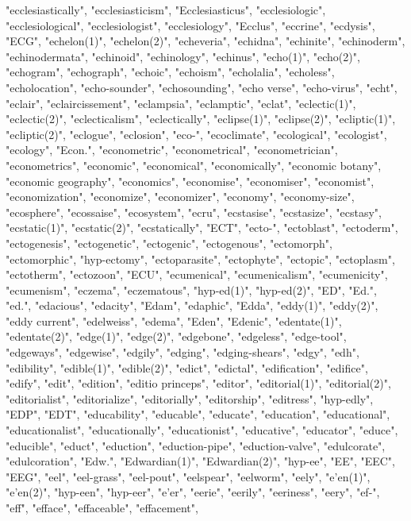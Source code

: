 "ecclesiastically",
"ecclesiasticism",
"Ecclesiasticus",
"ecclesiologic",
"ecclesiological",
"ecclesiologist",
"ecclesiology",
"Ecclus",
"eccrine",
"ecdysis",
"ECG",
"echelon(1)",
"echelon(2)",
"echeveria",
"echidna",
"echinite",
"echinoderm",
"echinodermata",
"echinoid",
"echinology",
"echinus",
"echo(1)",
"echo(2)",
"echogram",
"echograph",
"echoic",
"echoism",
"echolalia",
"echoless",
"echolocation",
"echo-sounder",
"echosounding",
"echo verse",
"echo-virus",
"echt",
"eclair",
"eclaircissement",
"eclampsia",
"eclamptic",
"eclat",
"eclectic(1)",
"eclectic(2)",
"eclecticalism",
"eclectically",
"eclipse(1)",
"eclipse(2)",
"ecliptic(1)",
"ecliptic(2)",
"eclogue",
"eclosion",
"eco-",
"ecoclimate",
"ecological",
"ecologist",
"ecology",
"Econ.",
"econometric",
"econometrical",
"econometrician",
"econometrics",
"economic",
"economical",
"economically",
"economic botany",
"economic geography",
"economics",
"economise",
"economiser",
"economist",
"economization",
"economize",
"economizer",
"economy",
"economy-size",
"ecosphere",
"ecossaise",
"ecosystem",
"ecru",
"ecstasise",
"ecstasize",
"ecstasy",
"ecstatic(1)",
"ecstatic(2)",
"ecstatically",
"ECT",
"ecto-",
"ectoblast",
"ectoderm",
"ectogenesis",
"ectogenetic",
"ectogenic",
"ectogenous",
"ectomorph",
"ectomorphic",
"hyp-ectomy",
"ectoparasite",
"ectophyte",
"ectopic",
"ectoplasm",
"ectotherm",
"ectozoon",
"ECU",
"ecumenical",
"ecumenicalism",
"ecumenicity",
"ecumenism",
"eczema",
"eczematous",
"hyp-ed(1)",
"hyp-ed(2)",
"ED",
"Ed.",
"ed.",
"edacious",
"edacity",
"Edam",
"edaphic",
"Edda",
"eddy(1)",
"eddy(2)",
"eddy current",
"edelweiss",
"edema",
"Eden",
"Edenic",
"edentate(1)",
"edentate(2)",
"edge(1)",
"edge(2)",
"edgebone",
"edgeless",
"edge-tool",
"edgeways",
"edgewise",
"edgily",
"edging",
"edging-shears",
"edgy",
"edh",
"edibility",
"edible(1)",
"edible(2)",
"edict",
"edictal",
"edification",
"edifice",
"edify",
"edit",
"edition",
"editio princeps",
"editor",
"editorial(1)",
"editorial(2)",
"editorialist",
"editorialize",
"editorially",
"editorship",
"editress",
"hyp-edly",
"EDP",
"EDT",
"educability",
"educable",
"educate",
"education",
"educational",
"educationalist",
"educationally",
"educationist",
"educative",
"educator",
"educe",
"educible",
"educt",
"eduction",
"eduction-pipe",
"eduction-valve",
"edulcorate",
"edulcoration",
"Edw.",
"Edwardian(1)",
"Edwardian(2)",
"hyp-ee",
"EE",
"EEC",
"EEG",
"eel",
"eel-grass",
"eel-pout",
"eelspear",
"eelworm",
"eely",
"e'en(1)",
"e'en(2)",
"hyp-een",
"hyp-eer",
"e'er",
"eerie",
"eerily",
"eeriness",
"eery",
"ef-",
"eff",
"efface",
"effaceable",
"effacement",
